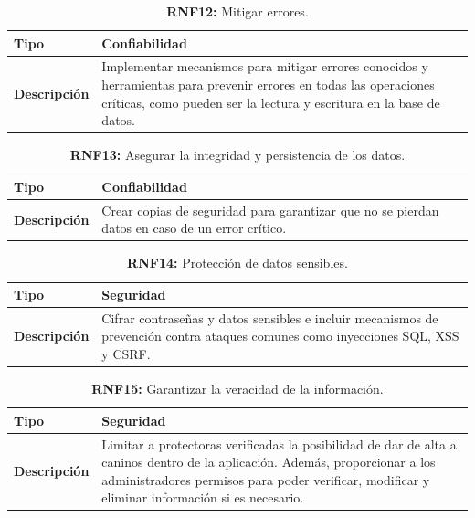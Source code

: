 \documentclass[a4paper, 12pt]{article}
\begin{document}
\begin{table}[H]
\captionsetup{list=no}%
\captionsetup{justification=raggedright,singlelinecheck=false}
\captionsetup{labelformat=empty}
\caption{\textbf{RNF12:} Mitigar errores.}
\label{tab:RNF12}
    \begin{tabular}{|m{5cm}|m{10cm}|}
	    \hline
	    \textbf{Tipo} & Confiabilidad \\ 
	    \hline
	    \textbf{Descripción} & Implementar mecanismos para mitigar errores conocidos y herramientas para prevenir errores en todas las operaciones críticas, como pueden ser la lectura y escritura en la base de datos. \\ 
	    \hline
    \end{tabular}
\end{table}

\begin{table}[H]
\captionsetup{list=no}%
\captionsetup{justification=raggedright,singlelinecheck=false}
\captionsetup{labelformat=empty}
\caption{\textbf{RNF13:} Asegurar la integridad y persistencia de los datos.}
\label{tab:RNF13}
    \begin{tabular}{|m{5cm}|m{10cm}|}
	    \hline
	    \textbf{Tipo} & Confiabilidad \\ 
	    \hline
	    \textbf{Descripción} & Crear copias de seguridad para garantizar que no se pierdan datos en caso de un error crítico. \\ 
	    \hline
    \end{tabular}
\end{table}


\begin{table}[H]
\captionsetup{list=no}%
\captionsetup{justification=raggedright,singlelinecheck=false}
\captionsetup{labelformat=empty}
\caption{\textbf{RNF14:} Protección de datos sensibles.}
\label{tab:RNF14}
    \begin{tabular}{|m{5cm}|m{10cm}|}
	    \hline
	    \textbf{Tipo} & Seguridad \\ 
	    \hline
	    \textbf{Descripción} & Cifrar contraseñas y datos sensibles e incluir mecanismos de prevención contra ataques comunes como inyecciones SQL, XSS y CSRF.\\ 
	    \hline
    \end{tabular}
\end{table}


\begin{table}[H]
\captionsetup{list=no}%
\captionsetup{justification=raggedright,singlelinecheck=false}
\captionsetup{labelformat=empty}
\caption{\textbf{RNF15:} Garantizar la veracidad de la información.}
\label{tab:RNF15}
    \begin{tabular}{|m{5cm}|m{10cm}|}
	    \hline
	    \textbf{Tipo} & Seguridad \\ 
	    \hline
	    \textbf{Descripción} & Limitar a protectoras verificadas la posibilidad de dar de alta a caninos dentro de la aplicación. Además, proporcionar a los administradores permisos para poder verificar, modificar y eliminar información si es necesario. \\ 
	    \hline
    \end{tabular}
\end{table}
\end{document}
